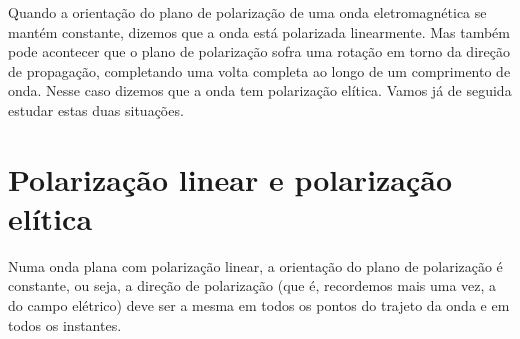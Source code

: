 Quando a orientação do plano de polarização de uma onda eletromagnética se
mantém constante, dizemos que a onda está polarizada linearmente. Mas também
pode acontecer que o plano de polarização sofra uma rotação em torno da direção
de propagação, completando uma volta completa ao longo de um comprimento de
onda. Nesse caso dizemos que a onda tem polarização elítica. Vamos já de seguida
estudar estas duas situações.

\section{Polarização linear e polarização elítica}
Numa onda plana com polarização linear, a orientação do plano de polarização
é constante, ou seja, a direção de polarização (que é, recordemos mais uma vez,
a do campo elétrico) deve ser a mesma em todos os pontos do trajeto da onda e em
todos os instantes.

